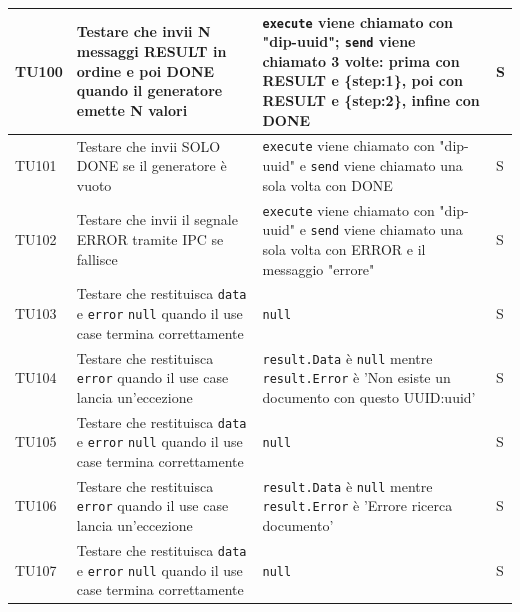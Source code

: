 \documentclass[a4paper,12pt]{article}
\begin{document}
\begin{longtable}{|M{1.2cm}|M{5cm}|M{8cm}|M{1.5cm}|}
            TU100 & Testare che \texttt{} invii N messaggi RESULT in ordine e poi DONE quando il generatore emette N valori & \texttt{execute} viene chiamato con "dip-uuid"; \texttt{send} viene chiamato 3 volte: prima con RESULT e \{step:1\}, poi con RESULT e \{step:2\}, infine con DONE & S \\
            \hline

            TU101 & Testare che \texttt{} invii SOLO DONE se il generatore è vuoto & \texttt{execute} viene chiamato con "dip-uuid" e \texttt{send} viene chiamato una sola volta con DONE & S \\
            \hline
        
            TU102 & Testare che \texttt{} invii il segnale ERROR tramite IPC se fallisce & \texttt{execute} viene chiamato con "dip-uuid" e \texttt{send} viene chiamato una sola volta con ERROR e il messaggio "errore" & S \\
            \hline

            TU103 & Testare che \texttt{} restituisca \texttt{data} e \texttt{error} \texttt{null} quando il use case termina correttamente & \texttt{null} & S \\
            \hline

            TU104 & Testare che \texttt{} restituisca \texttt{error} quando il use case lancia un'eccezione & \texttt{result.Data} è \texttt{null} mentre \texttt{result.Error} è 'Non esiste un documento con questo UUID:uuid'  & S \\
            \hline

            TU105 & Testare che \texttt{} restituisca \texttt{data} e \texttt{error} \texttt{null} quando il use case termina correttamente & \texttt{null} & S \\
            \hline

            TU106 & Testare che \texttt{} restituisca \texttt{error} quando il use case lancia un'eccezione & \texttt{result.Data} è \texttt{null} mentre \texttt{result.Error} è 'Errore ricerca documento' & S \\
            \hline

            TU107 & Testare che \texttt{} restituisca \texttt{data} e \texttt{error} \texttt{null} quando il use case termina correttamente & \texttt{null} & S \\
            \hline


\end{longtable}
\end{document}
